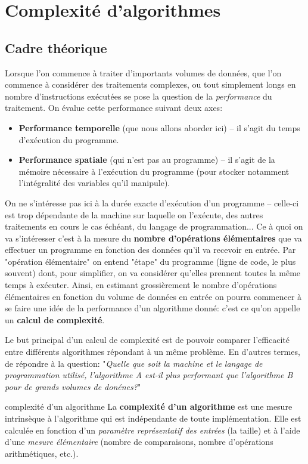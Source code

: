 \documentclass[12pt]{article}
\begin{document}
	\pagebreak
	\section{Complexité d'algorithmes}
	\subsection{Cadre théorique}
	Lorsque l'on commence à traiter d'importants volumes de données, que l'on commence à considérer des traitements complexes, ou tout simplement longs en nombre d'instructions exécutées se pose la question de la \textit{performance} du traitement. On évalue cette performance suivant deux axes:
	\begin{itemize}
		\item \textbf{Performance temporelle} (que nous allons aborder ici) -- il s'agit du temps d'exécution du programme.
		\item \textbf{Performance spatiale }(qui n'est pas au programme) -- il s'agit de la mémoire nécessaire à l'exécution du programme (pour stocker notamment l'intégralité des variables qu'il manipule).
	\end{itemize}
	
	On ne s'intéresse pas ici à la durée exacte d'exécution d'un programme -- celle-ci est trop dépendante de la machine sur laquelle on l'exécute, des autres traitements en cours le cas échéant, du langage de programmation... Ce à quoi on va s'intéresser c'est à la mesure du \textbf{nombre d'opérations élémentaires} que va effectuer un programme en fonction des données qu'il va recevoir en entrée. Par "opération élémentaire" on entend "étape" du programme (ligne de code, le plus souvent) dont, pour simplifier, on va considérer qu'elles prennent toutes la même temps à exécuter. Ainsi, en estimant grossièrement le nombre d'opérations élémentaires en fonction du volume de données en entrée on pourra commencer à se faire une idée de la performance d'un algorithme donné: c'est ce qu'on appelle un \textbf{calcul de complexité}.
	
	Le but principal d'un calcul de complexité est de pouvoir comparer l’efficacité entre différents algorithmes répondant à un même problème. En d'autres termes, de répondre à la question: "\textit{Quelle que soit la machine et le langage de programmation utilisé, l'algorithme A est-il plus performant que l'algorithme B pour de grands volumes de donénes?}"
	
	\begin{MaDef}{complexité d'un algorithme}
		La \textbf{complexité d’un algorithme} est une mesure intrinsèque à l'algorithme qui est indépendante de toute implémentation. Elle est calculée en fonction d’un \textit{paramètre représentatif des entrées} (la taille) et à l'aide d'une \textit{mesure élémentaire} (nombre de comparaisons, nombre d’opérations arithmétiques, etc.).
	\end{MaDef}
	
\end{document}
